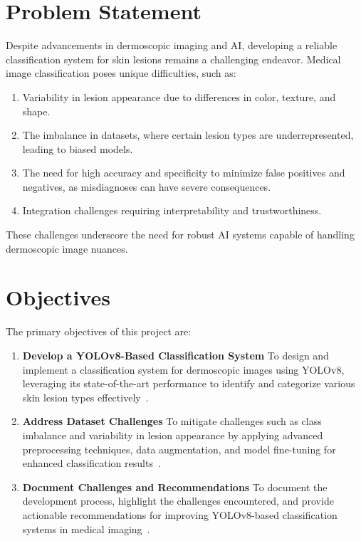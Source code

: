 \documentclass[a4paper,12pt]{report}
\begin{document}
\begin{spacing}{1.5}
    \section{Problem Statement}
    Despite advancements in dermoscopic imaging and AI, developing a reliable classification system for skin lesions remains a challenging endeavor. Medical image classification poses unique difficulties, such as:
    \begin{enumerate}
        \item Variability in lesion appearance due to differences in color, texture, and shape.
        \item The imbalance in datasets, where certain lesion types are underrepresented, leading to biased models.
        \item The need for high accuracy and specificity to minimize false positives and negatives, as misdiagnoses can have severe consequences.
        \item Integration challenges requiring interpretability and trustworthiness.
    \end{enumerate}
    These challenges underscore the need for robust AI systems capable of handling dermoscopic image nuances\cite{intro5}\cite{intro6}.

    \section{Objectives}
    The primary objectives of this project are:
    \begin{enumerate}
        \item \textbf{Develop a YOLOv8-Based Classification System} To design and implement a classification system for dermoscopic images using YOLOv8, leveraging its state-of-the-art performance to identify and categorize various skin lesion types effectively~\cite{ultralytics23}.
        \item \textbf{Address Dataset Challenges} To mitigate challenges such as class imbalance and variability in lesion appearance by applying advanced preprocessing techniques, data augmentation, and model fine-tuning for enhanced classification results~\cite{dl7}.
        \item \textbf{Document Challenges and Recommendations} To document the development process, highlight the challenges encountered, and provide actionable recommendations for improving YOLOv8-based classification systems in medical imaging~\cite{intro5}.
    \end{enumerate}


\end{spacing}
\end{document}
